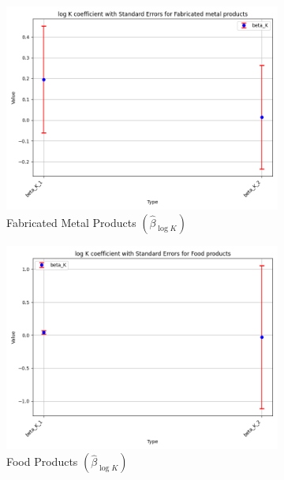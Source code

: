 \documentclass{article}
\begin{document}
\begin{figure}[ht!]
    \begin{subfigure}[t]{0.32\textwidth}
        \centering
        \includegraphics[width=\textwidth]{figure/empirical_ar1_normal_kmshare_ciiu_beta_logK_with_error_bars_Fabricated metal products.png}
        \caption{Fabricated Metal Products $(\hat{\beta}_{\log K})$}
    \end{subfigure}
    \begin{subfigure}[t]{0.32\textwidth}
        \centering
        \includegraphics[width=\textwidth]{figure/empirical_ar1_normal_kmshare_ciiu_beta_logK_with_error_bars_Food products.png}
        \caption{Food Products $(\hat{\beta}_{\log K})$}
    \end{subfigure}
    \begin{subfigure}[t]{0.32\textwidth}

\end{subfigure}
\end{figure}
\end{document}

